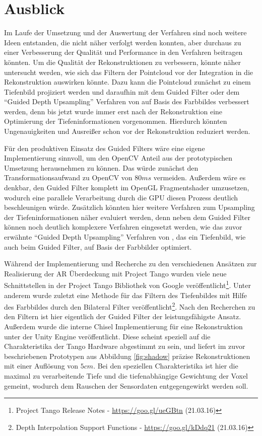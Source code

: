 \section{Ausblick}

Im Laufe der Umsetzung und der Auswertung der Verfahren sind noch weitere Ideen entstanden, die nicht näher verfolgt werden konnten, aber durchaus zu einer Verbesserung der Qualität und Performance in den Verfahren beitragen könnten. Um die Qualität der Rekonstruktionen zu verbessern, könnte näher untersucht werden, wie sich das Filtern der Pointcloud vor der Integration in die Rekonstruktion auswirken könnte. Dazu kann die Pointcloud zunächst zu einem Tiefenbild projiziert werden und daraufhin mit dem Guided Filter oder dem \enquote{Guided Depth Upsampling} Verfahren von \citet{Ferstl_2013_ICCV} auf Basis des Farbbildes verbessert werden, denn bis jetzt wurde immer erst nach der Rekonstruktion eine Optimierung der Tiefeninformationen vorgenommen. Hierdurch könnten Ungenauigkeiten und Ausreißer schon vor der Rekonstruktion reduziert werden. 

Für den produktiven Einsatz des Guided Filters wäre eine eigene Implementierung sinnvoll, um den OpenCV Anteil aus der prototypischen Umsetzung herausnehmen zu können. Das würde zunächst den Transformationsaufwand zu OpenCV von \(80 ms\) vermeiden. Außerdem wäre es denkbar, den Guided Filter komplett im OpenGL Fragmentshader umzusetzen, wodurch eine parallele Verarbeitung durch die GPU diesen Prozess deutlich beschleunigen würde. Zusätzlich könnten hier weitere Verfahren zum Upsampling der Tiefeninformationen näher evaluiert werden, denn neben dem Guided Filter können noch deutlich komplexere Verfahren eingesetzt werden, wie das zuvor erwähnte \enquote{Guided Depth Upsampling} Verfahren von \citet{Ferstl_2013_ICCV}, das ein Tiefenbild, wie auch beim Guided Filter, auf Basis der Farbbilder optimiert. 

Während der Implementierung und Recherche zu den verschiedenen Ansätzen zur Realisierung der AR Überdeckung mit Project Tango wurden viele neue Schnittstellen in der Project Tango Bibliothek von Google veröffentlicht\footnote{Project Tango Release Notes - \url{https://goo.gl/ueGBtn} (21.03.16)}.  Unter anderem wurde zuletzt eine Methode für das Filtern des Tiefenbildes mit Hilfe des Farbbildes durch den Bilateral Filter veröffentlicht\footnote{Depth Interpolation Support Functions - \url{https://goo.gl/kDdq21} (21.03.16)}. Nach den Recherchen zu den Filtern ist hier eigentlich der Guided Filter der leistungsfähigste Ansatz. Außerdem wurde die interne Chisel Implementierung für eine Rekonstruktion unter der Unity Engine veröffentlicht. Diese scheint speziell auf die Charakteristika der Tango Hardware abgestimmt zu sein, und liefert im zuvor beschriebenen Prototypen aus Abbildung \ref{fig:shadow} präzise Rekonstruktionen mit einer Auflösung von \(5cm\). Bei den speziellen Charakteristika ist hier die maximal zu verarbeitende Tiefe und die tiefenabhängige Gewichtung der Voxel gemeint, wodurch dem Rauschen der Sensordaten entgegengewirkt werden soll.


